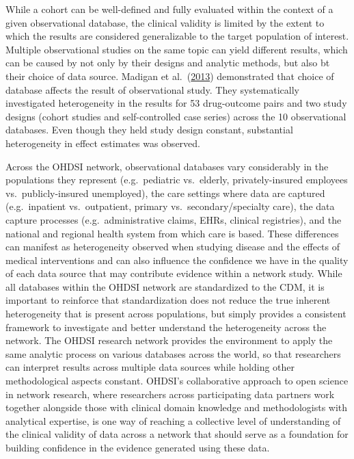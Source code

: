 \documentclass[
  letterpaper,
  paper=7in:10in,
  pagesize=pdftex,
  headinclude=on,
  footinclude=on,
  12pt]{scrbook}
\begin{document}
While a cohort can be well-defined and fully evaluated within the
context of a given observational database, the clinical validity is
limited by the extent to which the results are considered generalizable
to the target population of interest. Multiple observational studies on
the same topic can yield different results, which can be caused by not
only by their designs and analytic methods, but also bt their choice of
data source. Madigan et al.~(\hyperref[ref-madigan_2013]{2013})
demonstrated that choice of database affects the result of observational
study. They systematically investigated heterogeneity in the results for
53 drug-outcome pairs and two study designs (cohort studies and
self-controlled case series) across the 10 observational databases. Even
though they held study design constant, substantial heterogeneity in
effect estimates was observed.

Across the OHDSI network, observational databases vary considerably in
the populations they represent (e.g.~pediatric vs.~elderly,
privately-insured employees vs.~publicly-insured unemployed), the care
settings where data are captured (e.g.~inpatient vs.~outpatient, primary
vs.~secondary/specialty care), the data capture processes
(e.g.~administrative claims, EHRs, clinical registries), and the
national and regional health system from which care is based. These
differences can manifest as heterogeneity observed when studying disease
and the effects of medical interventions and can also influence the
confidence we have in the quality of each data source that may
contribute evidence within a network study. While all databases within
the OHDSI network are standardized to the CDM, it is important to
reinforce that standardization does not reduce the true inherent
heterogeneity that is present across populations, but simply provides a
consistent framework to investigate and better understand the
heterogeneity across the network. The OHDSI research network provides
the environment to apply the same analytic process on various databases
across the world, so that researchers can interpret results across
multiple data sources while holding other methodological aspects
constant. OHDSI's collaborative approach to open science in network
research, where researchers across participating data partners work
together alongside those with clinical domain knowledge and
methodologists with analytical expertise, is one way of reaching a
collective level of understanding of the clinical validity of data
across a network that should serve as a foundation for building
confidence in the evidence generated using these data.
\end{document}
